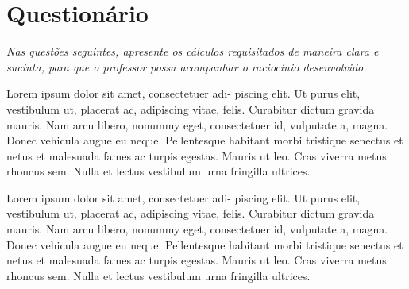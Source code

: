 \begin{fullwidth}
\noindent{}
\vspace{5mm}

\noindent{}

\noindent{}

\noindent{}

\noindent{}

\noindent{}
\end{fullwidth}

\vspace{5mm}

\section{Questionário}
\emph{Nas questões seguintes, apresente os cálculos requisitados de maneira clara e sucinta, para que o professor possa acompanhar o raciocínio desenvolvido.}
\vspace{5mm}

\begin{question}[type={exam}]{2}
Lorem ipsum dolor sit amet, consectetuer adi-
piscing elit. Ut purus elit, vestibulum ut, placerat ac, adipiscing vitae,
felis. Curabitur dictum gravida mauris. Nam arcu libero, nonummy
eget, consectetuer id, vulputate a, magna. Donec vehicula augue
eu neque. Pellentesque habitant morbi tristique senectus et netus
et malesuada fames ac turpis egestas. Mauris ut leo. Cras viverra
metus rhoncus sem. Nulla et lectus vestibulum urna fringilla ultrices.
\end{question}

\begin{question}[type={exam}]{2}
Lorem ipsum dolor sit amet, consectetuer adi-
piscing elit. Ut purus elit, vestibulum ut, placerat ac, adipiscing vitae,
felis. Curabitur dictum gravida mauris. Nam arcu libero, nonummy
eget, consectetuer id, vulputate a, magna. Donec vehicula augue
eu neque. Pellentesque habitant morbi tristique senectus et netus
et malesuada fames ac turpis egestas. Mauris ut leo. Cras viverra
metus rhoncus sem. Nulla et lectus vestibulum urna fringilla ultrices.
\end{question}

